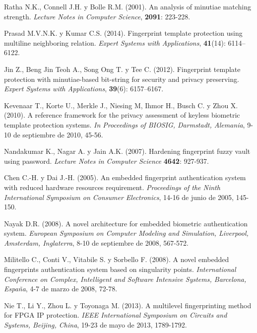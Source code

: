 \begin{thebibliography}{00}
Ratha N.K., Connell J.H. y Bolle R.M. (2001).
\newblock An analysis of minutiae matching strength.
\newblock \emph{Lecture Notes in Computer Science}, \textbf{2091}: 223-228.

Prasad M.V.N.K. y Kumar C.S. (2014).
\newblock Fingerprint template protection using multiline neighboring relation.
\newblock \emph{Expert Systems with Applications}, \textbf{41}(14):  6114–6122.

Jin Z., Beng Jin Teoh A., Song Ong T. y Tee C. (2012).
\newblock Fingerprint template protection with minutiae-based bit-string for security and privacy preserving.
\newblock \emph{Expert Systems with Applications}, \textbf{39}(6): 6157–6167.

Kevenaar T., Korte U., Merkle J., Niesing M, Ihmor H., Busch C. y Zhou X. (2010).
\newblock A reference framework for the privacy assessment of keyless biometric template protection systems.
\newblock \emph{In Proceedings of BIOSIG, Darmstadt, Alemania}, 9-10 de septiembre de 2010, 45-56.

Nandakumar K., Nagar A. y Jain A.K. (2007).
\newblock Hardening fingerprint fuzzy vault using password.
\newblock \emph{Lecture Notes in Computer Science} \textbf{4642}: 927-937.

Chen C.-H. y Dai J.-H. (2005).
\newblock An embedded fingerprint authentication system with reduced hardware resources requirement.
\newblock \emph{Proceedings of the Ninth International Symposium on Consumer Electronics}, 14-16 de junio de 2005, 145-150.

Nayak D.R. (2008).
\newblock A novel architecture for embedded biometric authentication system.
\newblock \emph{European Symposium on Computer Modeling and Simulation, Liverpool, Amsterdam, Inglaterra}, 8-10 de septiembre de 2008, 567-572.

Militello C., Conti V., Vitabile S. y Sorbello F. (2008).
\newblock A novel embedded fingerprints authentication system based on singularity points.
\newblock \emph{International Conference on Complex, Intelligent and Software Intensive Systems, Barcelona, España}, 4-7 de marzo de 2008, 72-78.

Nie T., Li Y., Zhou L. y Toyonaga M. (2013).
\newblock A multilevel fingerprinting method for FPGA IP protection.
\newblock \emph{IEEE International Symposium on Circuits and Systems, Beijing, China}, 19-23 de mayo de 2013, 1789-1792.


\end{thebibliography}
